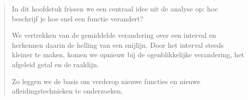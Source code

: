 \documentclass{ximera}
\begin{document}
\begin{abstract}
In dit hoofdstuk frissen we een centraal idee uit de analyse op:
hoe beschrijf je hoe snel een functie verandert?

We vertrekken van de gemiddelde verandering over een interval en
herkennen daarin de helling van een snijlijn. Door het interval steeds
kleiner te maken, komen we opnieuw bij de ogenblikkelijke verandering,
het afgeleid getal en de raaklijn.

Zo leggen we de basis om verderop nieuwe functies en nieuwe
afleidingstechnieken te onderzoeken.
\end{abstract}

\maketitle


\end{document}

